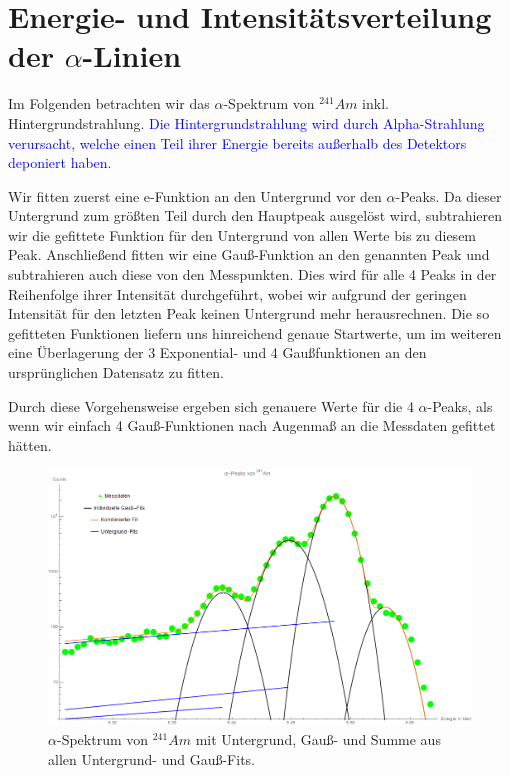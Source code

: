 \documentclass[bigchapter,colorback,accentcolor=tud4b,linedtoc,11pt]{tudreport}
\begin{document}
\section{Energie- und Intensitätsverteilung der $\alpha$-Linien}

Im Folgenden betrachten wir das $\alpha$-Spektrum von $^{241}Am$
inkl. Hintergrundstrahlung. \textcolor{blue}{Die Hintergrundstrahlung wird durch Alpha-Strahlung
verursacht, welche einen Teil ihrer Energie bereits außerhalb des Detektors
deponiert haben.}

Wir fitten zuerst eine e-Funktion an den Untergrund vor den $\alpha$-Peaks. Da
dieser Untergrund zum größten Teil durch den Hauptpeak ausgelöst wird,
subtrahieren wir die gefittete Funktion für den Untergrund von allen Werte bis
zu diesem Peak. Anschließend fitten wir eine Gauß-Funktion an den genannten Peak
und subtrahieren auch diese von den Messpunkten. Dies wird für alle 4 Peaks in
der Reihenfolge ihrer Intensität durchgeführt, wobei wir aufgrund der geringen
Intensität für den letzten Peak keinen Untergrund mehr herausrechnen. Die so
gefitteten Funktionen liefern uns hinreichend genaue Startwerte, um im weiteren
eine Überlagerung der 3 Exponential- und 4 Gaußfunktionen an den ursprünglichen
Datensatz zu fitten.

Durch diese Vorgehensweise ergeben sich genauere Werte für die 4 $\alpha$-Peaks,
als wenn wir einfach 4 Gauß-Funktionen nach Augenmaß an die Messdaten gefittet hätten.

\begin{figure}[H] 
  \centering
     \includegraphics[width=1\textwidth]{img/alpha-spektrum.png}
  \caption{$\alpha$-Spektrum von $^{241}Am$ mit Untergrund, Gauß- und
    Summe aus allen Untergrund- und Gauß-Fits.}
  \label{fig:Bild1}
\end{figure}
\end{document}
